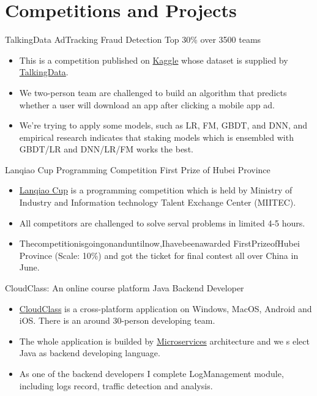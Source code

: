 \documentclass[letterpaper]{twentysecondcv} %
\begin{document}
\section{Competitions and Projects}

\begin{twentyshort}
	\setlength{\itemsep}{0pt}
	\setlength{\parsep}{0pt}
	\setlength{\parskip}{0pt}
		{\quad TalkingData AdTracking Fraud Detection}
		{Top 30\% over 3500 teams}
		{
			\begin{itemize}
				\item This is a competition published on \href{https://www.kaggle.com/c/talkingdata-adtracking-fraud-detection}{Kaggle}
				whose dataset is supplied by \href{https://www.talkingdata.com/}{TalkingData}.
				\item We two-person team are challenged to build an algorithm that predicts whether a user will download an app after clicking a mobile app ad.
				\item We're trying to apply some models, such as LR, FM, GBDT, and DNN, 
				and empirical research indicates that staking models which is ensembled with 
				GBDT/LR and DNN/LR/FM works the best.
			\end{itemize}
		}
		{\quad Lanqiao Cup Programming Competition}
		{First Prize of Hubei Province}
		{
			\begin{itemize}
				\item \href{http://dasai.lanqiao.cn/}{Lanqiao Cup} is a programming competition which is held by Ministry of Industry and Information technology Talent Exchange Center (MIITEC).
				\item All competitors are challenged to solve serval problems in limited 4-5 hours.
				\item Thecompetitionisgoingonanduntilnow,Ihavebeenawarded FirstPrizeofHubei Province (Scale: 10\%) and got the ticket for final contest all over China in June.
			\end{itemize}
		}
		{\quad CloudClass: An online course platform}
		{Java Backend Developer}
		{
			\begin{itemize}
				\item \href{https://www.dxtwangxiao.com/}{CloudClass} is a cross-platform application on Windows, MacOS, Android and iOS. There is an around 30-person developing team.
				\item The whole application is builded by \href{https://en.wikipedia.org/wiki/Microservices}{Microservices} architecture and we s elect Java as backend developing language.
				\item As one of the backend developers I complete LogManagement module, including logs record, traffic detection and analysis.
			\end{itemize}
		}
\end{twentyshort}
\end{document}
